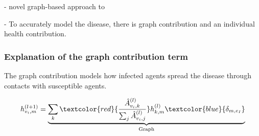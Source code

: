 - novel graph-based approach to

- To accurately model the disease, there is graph contribution and an individual health contribution.

\subsubsection{Explanation of the graph contribution term}
The graph contribution models how infected agents spread the disease through contacts with susceptible agents.

\begin{equation}
h_{v_i, m}^{(l+1)}
=
\underbrace{
	\sum_k \textcolor{red}{\frac{\hat{A}_{v_i, k}^{(l)}}{\sum_j \hat{A}_{v_i, j}^{(l)}}} h_{k, m}^{(l)} \textcolor{blue}{\delta_{m, e_I}}
}_{\text{Graph}}
\end{equation}

